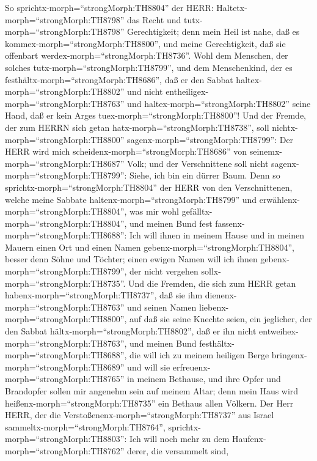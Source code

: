  So sprichtx-morph=``strongMorph:TH8804'' der HERR:
Haltetx-morph=``strongMorph:TH8798'' das Recht und
tutx-morph=``strongMorph:TH8798'' Gerechtigkeit; denn mein Heil ist
nahe, daß es kommex-morph=``strongMorph:TH8800'', und meine
Gerechtigkeit, daß sie offenbart werdex-morph=``strongMorph:TH8736''.
 Wohl dem Menschen, der solches
tutx-morph=``strongMorph:TH8799'', und dem Menschenkind, der es
festhältx-morph=``strongMorph:TH8686'', daß er den Sabbat
haltex-morph=``strongMorph:TH8802'' und nicht
entheiligex-morph=``strongMorph:TH8763'' und
haltex-morph=``strongMorph:TH8802'' seine Hand, daß er kein Arges
tuex-morph=``strongMorph:TH8800''!  Und der Fremde, der zum
HERRN sich getan hatx-morph=``strongMorph:TH8738'', soll
nichtx-morph=``strongMorph:TH8800'' sagenx-morph=``strongMorph:TH8799'':
Der HERR wird mich scheidenx-morph=``strongMorph:TH8686'' von
seinemx-morph=``strongMorph:TH8687'' Volk; und der Verschnittene soll
nicht sagenx-morph=``strongMorph:TH8799'': Siehe, ich bin ein dürrer
Baum.  Denn so sprichtx-morph=``strongMorph:TH8804'' der
HERR von den Verschnittenen, welche meine Sabbate
haltenx-morph=``strongMorph:TH8799'' und
erwählenx-morph=``strongMorph:TH8804'', was mir wohl
gefälltx-morph=``strongMorph:TH8804'', und meinen Bund fest
fassenx-morph=``strongMorph:TH8688'':  Ich will ihnen in
meinem Hause und in meinen Mauern einen Ort und einen Namen
gebenx-morph=``strongMorph:TH8804'', besser denn Söhne und Töchter;
einen ewigen Namen will ich ihnen gebenx-morph=``strongMorph:TH8799'',
der nicht vergehen sollx-morph=``strongMorph:TH8735''.  Und
die Fremden, die sich zum HERR getan
habenx-morph=``strongMorph:TH8737'', daß sie ihm
dienenx-morph=``strongMorph:TH8763'' und seinen Namen
liebenx-morph=``strongMorph:TH8800'', auf daß sie seine Knechte seien,
ein jeglicher, der den Sabbat hältx-morph=``strongMorph:TH8802'', daß er
ihn nicht entweihex-morph=``strongMorph:TH8763'', und meinen Bund
festhältx-morph=``strongMorph:TH8688'',  die will ich zu
meinem heiligen Berge bringenx-morph=``strongMorph:TH8689'' und will sie
erfreuenx-morph=``strongMorph:TH8765'' in meinem Bethause, und ihre
Opfer und Brandopfer sollen mir angenehm sein auf meinem Altar; denn
mein Haus wird heißenx-morph=``strongMorph:TH8735'' ein Bethaus allen
Völkern.  Der Herr HERR, der die
Verstoßenenx-morph=``strongMorph:TH8737'' aus Israel
sammeltx-morph=``strongMorph:TH8764'',
sprichtx-morph=``strongMorph:TH8803'': Ich will noch mehr zu dem
Haufenx-morph=``strongMorph:TH8762'' derer, die versammelt sind,
